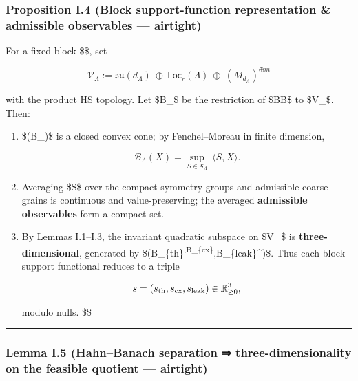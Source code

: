 \documentclass[
]{article}
\numberwithin{equation}{section}
\begin{document}
\hypertarget{proposition-i.4-block-support-function-representation-admissible-observables-airtight}{%
\subsubsection{Proposition I.4 (Block support-function representation \&
admissible observables ---
airtight)}\label{proposition-i.4-block-support-function-representation-admissible-observables-airtight}}

For a fixed block \$\Lambda\$, set

\[
\mathcal V_\Lambda:=\mathfrak{su}(d_\Lambda)\ \oplus\ \mathsf{Loc}_r(\Lambda)\ \oplus\ (M_{d_\Lambda})^{\oplus m}
\]

with the product HS topology. Let \$\mathcal B\_\Lambda\$ be the
restriction of \$\mathcal B\in\mathfrak B\$ to \$\mathcal V\_\Lambda\$.
Then:

\begin{enumerate}
\def\labelenumi{\arabic{enumi}.}
\item
  \$(\mathcal B\_\Lambda)\$ is a closed convex cone;
  by Fenchel--Moreau in finite dimension,

  \[
  \mathcal B_\Lambda(X)=\sup_{S\in\mathscr S_\Lambda}\ \langle S,X\rangle.
  \]
\item
  Averaging \$S\$ over the compact symmetry groups and admissible
  coarse-grains is continuous and value-preserving; the averaged
  \textbf{admissible observables} form a compact set.
\item
  By Lemmas I.1--I.3, the invariant quadratic subspace on
  \$\mathcal V\_\Lambda\$ is \textbf{three-dimensional}, generated by
  \$(\mathcal B\_\{\rm th\}\textsuperscript{\Lambda,\mathcal B\_\{\rm cx\}}\Lambda,\mathcal B\_\{\rm leak\}\^{}\Lambda)\$.
  Thus each block support functional reduces to a triple

  \[
  s=(s_{\rm th},s_{\rm cx},s_{\rm leak})\in\mathbb R_{\ge0}^3,
  \]

  modulo nulls. \$\square\$
\end{enumerate}

\begin{center}\rule{0.5\linewidth}{0.5pt}\end{center}

\hypertarget{lemma-i.5-hahnbanach-separation-three-dimensionality-on-the-feasible-quotient-airtight}{%
\subsubsection{Lemma I.5 (Hahn--Banach separation ⇒ three-dimensionality
on the feasible quotient ---
airtight)}\label{lemma-i.5-hahnbanach-separation-three-dimensionality-on-the-feasible-quotient-airtight}}
\end{document}
